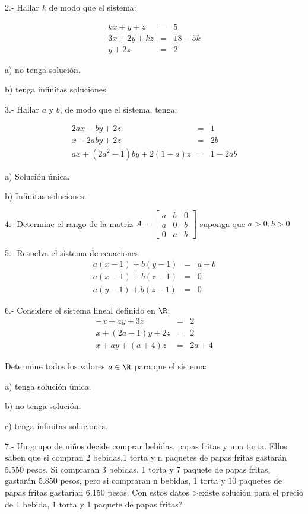 2.- Hallar $k$ de modo que el sistema:

\begin{eqnarray*}
kx  + y +z  &=& 5\\
3x  +2y  +kz &=&  18-5k\\
y  +2z&=&  2
\end{eqnarray*}

a) no tenga solución.

b) tenga infinitas soluciones.

3.- Hallar $a$ y $b$, de modo que el sistema, tenga:

\begin{eqnarray*}
2ax - by + 2z &=& 1\\
x - 2aby + 2z &=& 2b\\
ax + (2a^2 -1)by + 2(1 - a)z &=& 1 - 2ab
\end{eqnarray*}

a) Solución única.

b) Infinitas soluciones.

4.- Determine el rango de la matriz
$A= \begin{bmatrix}
a&b&0 \\
a&0&b\\
0&a&b
\end{bmatrix}
$
suponga que $a>0, b>0$

5.- Resuelva el sistema de ecuaciones
\begin{eqnarray*}
a(x - 1) + b(y - 1) &=& a + b\\
a(x - 1) + b(z - 1) &=& 0\\
a(y - 1) + b(z - 1) &=& 0
\end{eqnarray*}

6.- Considere el sistema lineal definido en $\R$:
\begin{eqnarray*}-
x +  ay + 3z &=& 2\\
x + (2a -1)y + 2z &=& 2\\
x + ay + (a+4)z &=& 2a+4
\end{eqnarray*}

Determine todos los valores $a \in \R$ para que el sistema:

a) tenga solución única.

b) no tenga solución.

c)  tenga infinitas soluciones.


7.- Un grupo de ni\~nos decide comprar bebidas, papas fritas y una torta.
 Ellos saben que si compran 2 bebidas,1 torta y n paquetes de papas
 fritas gastarán 5.550 pesos. Si compraran 3 bebidas, 1 torta y 7
 paquete de papas fritas, gastarán 5.850 pesos, pero si compraran n
 bebidas, 1 torta y 10 paquetes de papas fritas gastarían
6.150 pesos. Con estos datos >existe solución para el precio de 1
 bebida, 1 torta y 1 paquete de papas fritas?
 
